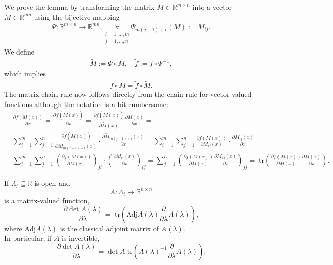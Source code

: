 \documentclass[a4paper,11pt]{report}
\newcommand{\tr}{\;\text{tr}}
\begin{document}
\begin{appendix}
\begin{Bew}
We prove the lemma by transforming the matrix $M\in\mathbb{R}^{m\times n}$ into a vector $\tilde{M}\in\mathbb{R}^{mn}$ using the bijective mapping
\begin{align*}
\Psi:\mathbb{R}^{m\times n}\to\mathbb{R}^{mn},
\underset{\substack{i=1,\dotsc,m\\j=1,\dotsc,n}}{\forall}\Psi_{m(j-1)+i}(M):=M_{ij}.
\end{align*}
We define
\begin{align*}
\tilde{M}:=\Psi\circ M,
\quad
\tilde{f}:=f\circ\Psi^{-1},
\end{align*}
which implies
\begin{align*}
f\circ M=\tilde{f}\circ\tilde{M}.
\end{align*}
The matrix chain rule now follows directly from the chain rule for vector-valued functions although the notation is a bit cumbersome:
\begin{align*}
&\frac{\partial f\left(M(x)\right)}{\partial x}=
\frac{\partial\tilde{f}\left(\tilde{M}(x)\right)}{\partial x}=
\frac{\partial\tilde{f}\left(\tilde{M}(x)\right)}{\partial \tilde{M}(x)}\frac{\partial\tilde{M}(x)}{\partial x}=\\
&\sum_{i=1}^m\sum_{j=1}^n
\frac{\partial\tilde{f}\left(\tilde{M}(x)\right)}{\partial\tilde{M}_{m(j-1)+i}(x)}\cdot
\frac{\partial\tilde{M}_{m(j-1)+i}(x)}{\partial x}=
\sum_{i=1}^m\sum_{j=1}^n
\frac{\partial f\left(M(x)\right)}{\partial M_{ij}(x)}\cdot
\frac{\partial M_{ij}(x)}{\partial x}=\\
&\sum_{i=1}^m\sum_{j=1}^n
\left(\frac{\partial f\left(M(x)\right)}{\partial M(x)}\right)_{ji}\cdot
\left(\frac{\partial M_{ij}(x)}{\partial x}\right)_{ij}=
\sum_{j=1}^n\left(\frac{\partial f\left(M(x)\right)}{\partial M(x)}\frac{\partial M_{ij}(x)}{\partial x}\right)_{jj}=
\tr\left(\frac{\partial f\left(M(x)\right)}{\partial M(x)}\frac{\partial M(x)}{\partial x}\right).
\end{align*}
\end{Bew}

\begin{Lem}\label{jacobis-formula}
If $\Lambda_i\subseteq\mathbb{R}$ is open and
\[
A:\Lambda_i\to\mathbb{R}^{n\times n}
\]
is a matrix-valued function, 
\[
\frac{\partial \det A(\lambda)}{\partial\lambda}=\tr\left(\text{Adj}A(\lambda)\frac{\partial}{\partial\lambda}A(\lambda)\right),
\]
where $\text{Adj}A(\lambda)$ is the classical adjoint matrix of $A(\lambda)$.\\
In particular, if $A$ is invertible,
\[
\frac{\partial \det A(\lambda)}{\partial\lambda}=\det A\tr\left(A(\lambda)^{-1}\frac{\partial}{\partial\lambda}A(\lambda)\right).
\]
\end{Lem}


\end{appendix}
\end{document}
